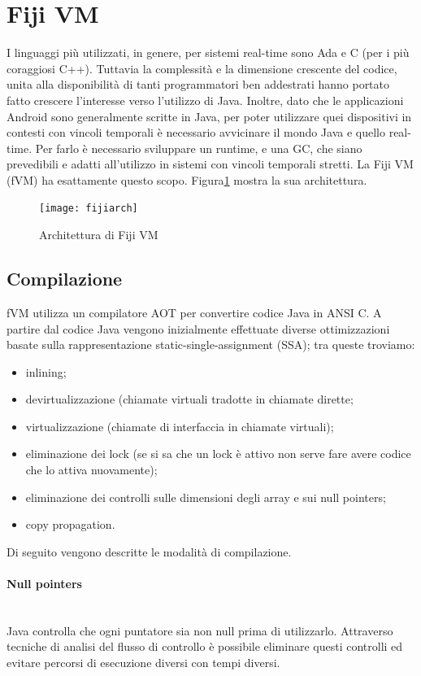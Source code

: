 \section{Fiji VM}
I linguaggi più utilizzati, in genere, per sistemi real-time sono Ada e C (per i più coraggiosi C++). Tuttavia la complessità e la dimensione crescente del codice, unita alla disponibilità di tanti programmatori ben addestrati hanno portato fatto crescere l'interesse verso l'utilizzo di Java. Inoltre, dato che le applicazioni Android sono generalmente scritte in Java, per poter utilizzare quei dispositivi in contesti con vincoli temporali è necessario avvicinare il mondo Java e quello real-time. Per farlo è necessario sviluppare un runtime, e una GC, che siano prevedibili e adatti all'utilizzo in sistemi con vincoli temporali stretti. La Fiji VM (fVM) ha esattamente questo scopo. Figura\ref{fig:fijiarch} mostra la sua architettura.
\begin{figure}
	\centering
	\texttt{[image: fijiarch]}
	\caption[Architettura di Fiji VM]{Architettura di Fiji VM}
	\label{fig:fijiarch}
\end{figure}

\subsection{Compilazione}
fVM utilizza un compilatore AOT per convertire codice Java in ANSI C. A partire dal codice Java vengono inizialmente effettuate diverse ottimizzazioni basate sulla rappresentazione static-single-assignment (SSA); tra queste troviamo:
\begin{itemize}
	\item inlining;
	\item devirtualizzazione (chiamate virtuali tradotte in chiamate dirette;
	\item virtualizzazione (chiamate di interfaccia in chiamate virtuali);
	\item eliminazione dei lock (se si sa che un lock è attivo non serve fare avere codice che lo attiva nuovamente);
	\item eliminazione dei controlli sulle dimensioni degli array e sui null pointers;
	\item copy propagation.
\end{itemize}
Di seguito vengono descritte le modalità di compilazione.

\paragraph{Null pointers} \mbox{} \\
Java controlla che ogni puntatore sia non null prima di utilizzarlo. Attraverso tecniche di analisi del flusso di controllo è possibile eliminare questi controlli ed evitare percorsi di esecuzione diversi con tempi diversi.


